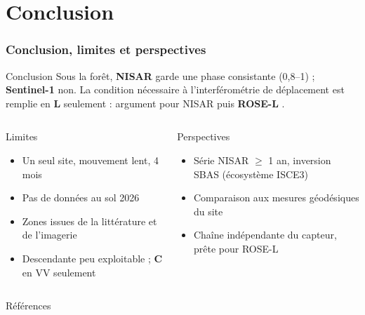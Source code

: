 \documentclass[aspectratio=169]{beamer}
\newcommand{\Lb}[1]{\textcolor{Lband}{\textbf{#1}}}
\newcommand{\Cb}[1]{\textcolor{Cband}{\textbf{#1}}}
\begin{document}
\section{Conclusion}

\begin{frame}{\phantom{x}}
	\frametitle{Conclusion, limites et perspectives}
	\vspace{-6pt}\scriptsize
	\begin{exampleblock}{Conclusion}
		\scriptsize
		Sous la forêt, \Lb{NISAR} garde une phase consistante (0,8--1) ; \Cb{Sentinel-1} non.
		La condition nécessaire à l'interférométrie de déplacement est remplie en \Lb{L} seulement :
		argument pour NISAR puis \textbf{ROSE-L} \parencite{esa2020rosel}.
	\end{exampleblock}
	\begin{columns}[T]
		\begin{alertblock}{Limites}
			\scriptsize
			\begin{itemize}
				\setlength{\itemsep}{0pt}
				\item Un seul site, mouvement lent, 4 mois
				\item Pas de données au sol 2026
				\item Zones issues de la littérature et de l'imagerie
				\item Descendante peu exploitable ; \Cb{C} en VV seulement
			\end{itemize}
		\end{alertblock}
		\begin{block}{Perspectives}
			\scriptsize
			\begin{itemize}
				\setlength{\itemsep}{0pt}
				\item Série NISAR $\geq$ 1 an, inversion SBAS (écosystème ISCE3)
				\item Comparaison aux mesures géodésiques du site
				\item Chaîne indépendante du capteur, prête pour ROSE-L
			\end{itemize}
		\end{block}
	\end{columns}
\end{frame}

\begin{frame}[allowframebreaks]{Références}
	\scriptsize
	\printbibliography[heading=none]
\end{frame}
\end{document}
